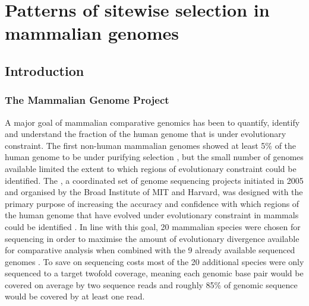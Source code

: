 \chapter{Patterns of sitewise selection in mammalian genomes}
\label{ch_mammals1}

\section{Introduction}

\subsection{The Mammalian Genome Project}

A major goal of mammalian comparative genomics has been to quantify,
identify and understand the fraction of the human genome that is under
evolutionary constraint. The first non-human mammalian genomes showed
at least 5\% of the human genome to be under purifying selection
\citep{Mouse2002Initial,Rat2004Genome,LindbladToh2005Genome}, but the
small number of genomes available limited the extent to which regions
of evolutionary constraint could be identified. The \mgp, a
coordinated set of genome sequencing projects initiated in 2005 and
organised by the Broad Institute of MIT and Harvard, was designed with
the primary purpose of increasing the accuracy and confidence with
which regions of the human genome that have evolved under evolutionary
constraint in mammals could be identified \citep{Margulies2007}. In
line with this goal, 20 mammalian species were chosen for sequencing
in order to maximise the amount of evolutionary divergence available
for comparative analysis when combined with the 9 already available
sequenced genomes \citep{Margulies2005Initial}. To save on sequencing
costs most of the 20 additional species were only sequenced to a
target twofold coverage, meaning each genomic base pair would be
covered on average by two sequence reads and roughly 85\% of genomic
sequence would be covered by at least one read.

